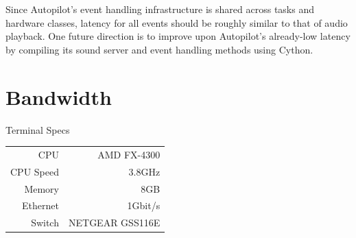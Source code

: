 Since Autopilot's event handling infrastructure is shared across tasks and hardware classes, latency for all events should be roughly similar to that of audio playback. One future direction is to improve upon Autopilot's already-low latency by compiling its sound server and event handling methods using Cython.

\section{Bandwidth}

\begin{margintable}[-6.6cm]
\caption{Terminal Specs}
\label{tab:terminal}
\noindent\begin{tabularx}{\linewidth}{rR}
\toprule
    CPU & AMD FX-4300 \\
    CPU Speed & 3.8GHz \\
    Memory & 8GB \\
    Ethernet & 1Gbit/s \\
    Switch & NETGEAR GSS116E \\
\bottomrule
\end{tabularx}
\end{margintable}

